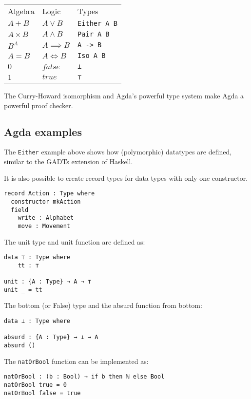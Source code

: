 \begin{table}[H]
\begin{tabular}{lll}
Algebra      & Logic                   & Types \\
$A + B$      & $A \vee B$              & \texttt{Either A B} \\
$A \times B$ & $A \wedge B$            & \texttt{Pair A B}\\
$B^A$        & $ A \implies B$         & \texttt{A -> B} \\
$A = B$      & $ A \iff B$             & \texttt{Iso A B}\\
$0$          & $ false $               & \texttt{⊥}\\
$1$          & $ true  $               & \texttt{⊤}
\end{tabular}
\end{table}


The Curry-Howard isomorphism and Agda's powerful type system make Agda a powerful proof checker.


\subsection{Agda examples}
The \texttt{Either} example above shows how (polymorphic) datatypes are defined, similar to the GADTs \cite{haskellGADT} extension of Haskell.

It is also possible to create record types for data types with only one constructor.

\begin{verbatim}
record Action : Type where
  constructor mkAction
  field
    write : Alphabet
    move : Movement
\end{verbatim}

The unit type and unit function are defined as:
\begin{verbatim}
data ⊤ : Type where
    tt : ⊤

unit : {A : Type} → A → ⊤
unit _ = tt
\end{verbatim}

The bottom (or False) type and the absurd function from bottom:
\begin{verbatim}
data ⊥ : Type where

absurd : {A : Type} → ⊥ → A
absurd ()
\end{verbatim}

The \texttt{natOrBool} function can be implemented as:
\begin{verbatim}
natOrBool : (b : Bool) → if b then ℕ else Bool
natOrBool true = 0
natOrBool false = true
\end{verbatim}

